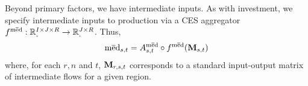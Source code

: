 \documentclass[12pt,a4paper,twoside, draft]{article}
\begin{document}
Beyond primary factors, we have intermediate inputs.
As with investment, we specify intermediate inputs to production via a CES
aggregator $f^{\med}: \nnreal^{I \times J \times R} \rightarrow
\nnreal^{J \times R}$.
Thus,
\begin{equation}\label{eq-ces-int}
  \textup{m}\overline{\textup{e}}\textup{d}_{{s}, t} = A_{{s}, t}^{\textup{m}\overline{\textup{e}}\textup{d}}
    \circ f^{\textup{m}\overline{\textup{e}}\textup{d}}(
      \mathbf{M}_{{s}, t}
      )
\end{equation}
where, for each $r, n$ and $t$, $\textbf{M}_{r, {s}, t}$
corresponds to a standard input-output matrix of intermediate flows for a given
region.
\end{document}
